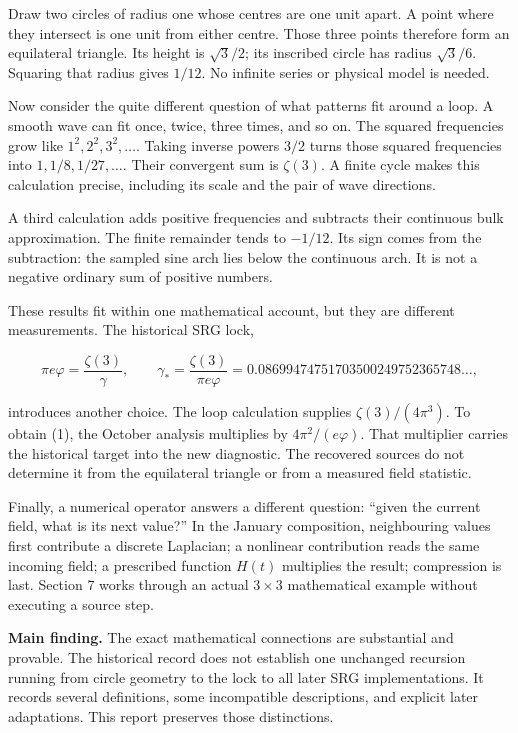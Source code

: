 \documentclass[11pt,a4paper]{article}
\begin{document}
Draw two circles of radius one whose centres are one unit apart. A point where they intersect is one unit from either centre. Those three points therefore form an equilateral triangle. Its height is $\sqrt3/2$; its inscribed circle has radius $\sqrt3/6$. Squaring that radius gives \textbf{$1/12$}. No infinite series or physical model is needed.


Now consider the quite different question of what patterns fit around a loop. A smooth wave can fit once, twice, three times, and so on. The squared frequencies grow like $1^2,2^2,3^2,\ldots$. Taking inverse powers $3/2$ turns those squared frequencies into $1,1/8,1/27,\ldots$. Their convergent sum is \textbf{$\zeta(3)$}. A finite cycle makes this calculation precise, including its scale and the pair of wave directions.


A third calculation adds positive frequencies and subtracts their continuous bulk approximation. The finite remainder tends to \textbf{$-1/12$}. Its sign comes from the subtraction: the sampled sine arch lies below the continuous arch. It is not a negative ordinary sum of positive numbers.


These results fit within one mathematical account, but they are different measurements. The historical SRG lock,


\[
\pi e\varphi=\frac{\zeta(3)}{\gamma},\qquad
\gamma_*=\frac{\zeta(3)}{\pi e\varphi}
=0.08699474751703500249752365748\ldots, \tag{1}
\]

introduces another choice. The loop calculation supplies $\zeta(3)/(4\pi^3)$. To obtain (1), the October analysis multiplies by $4\pi^2/(e\varphi)$. That multiplier carries the historical target into the new diagnostic. The recovered sources do not determine it from the equilateral triangle or from a measured field statistic.


Finally, a numerical operator answers a different question: ``given the current field, what is its next value?'' In the January composition, neighbouring values first contribute a discrete Laplacian; a nonlinear contribution reads the same incoming field; a prescribed function $H(t)$ multiplies the result; compression is last. Section 7 works through an actual $3\times3$ mathematical example without executing a source step.


\textbf{Main finding.} The exact mathematical connections are substantial and provable. The historical record does not establish one unchanged recursion running from circle geometry to the lock to all later SRG implementations. It records several definitions, some incompatible descriptions, and explicit later adaptations. This report preserves those distinctions.
\end{document}
